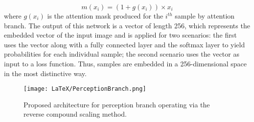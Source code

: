 \documentclass[a4paper]{article}
\begin{document}
$$
m\left(x_{i}\right)=\left(1+g\left(x_{i}\right)\right) \times x_{i}
$$
where $g(x_i)$ is the attention mask produced for the $i^{th}$ sample by attention branch. The output of this network is a vector of length 256, which represents the embedded vector of the input image and is applied for two scenarios: the first uses the vector along with a fully connected layer and the softmax layer to yield probabilities for each individual sample; the second scenario uses the vector as input to a loss function. Thus, samples are embedded in a 256-dimensional space in the most distinctive way.
\begin{figure}[t]
  \centering
  \texttt{[image: LaTeX/PerceptionBranch.png]}
  \caption{Proposed architecture for perception branch operating via the reverse compound scaling method.}
  \label{fig:PerceptionBranch}
\end{figure}
\end{document}
